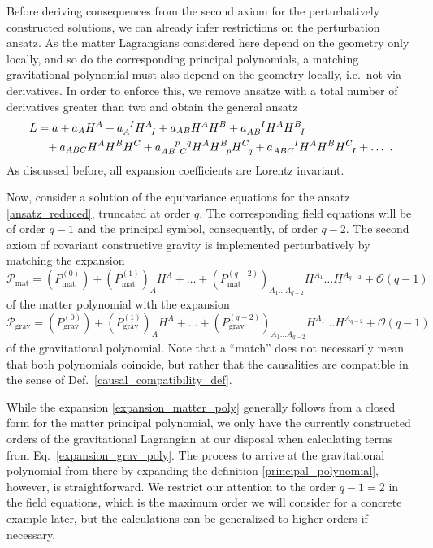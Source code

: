 Before deriving consequences from the second axiom for the perturbatively constructed solutions, we can already infer restrictions on the perturbation ansatz. As the matter Lagrangians considered here depend on the geometry only locally, and so do the corresponding principal polynomials, a matching gravitational polynomial must also depend on the geometry locally, i.e.~not via derivatives. In order to enforce this, we remove ansätze with a total number of derivatives greater than two and obtain the general ansatz
\begin{equation}\label{ansatz_reduced}
  \begin{aligned}
    L &{} = a + a_A H^A + a_A^{\hphantom AI} H^A_{\hphantom AI} + a_{AB} H^A H^B + a_{AB}^{\hphantom{AB}I} H^A H^B_{\hphantom BI} \\
      &{} \hphantom{=} + a_{ABC} H^A H^B H^C + a_{AB\hphantom pC}^{\hphantom{AB}p\hphantom Cq} H^A H^B_{\hphantom Bp} H^C_{\hphantom Cq} + a_{ABC}^{\hphantom{ABC}I} H^A H^B H^C_{\hphantom CI} + \dots \ .
  \end{aligned}
\end{equation}
As discussed before, all expansion coefficients are Lorentz invariant.

Now, consider a solution of the equivariance equations for the ansatz \eqref{ansatz_reduced}, truncated at order $q$. The corresponding field equations will be of order $q-1$ and the principal symbol, consequently, of order $q-2$. The second axiom of covariant constructive gravity is implemented perturbatively by matching the expansion
\begin{equation}\label{expansion_matter_poly}
  \mathcal P_\text{mat} = (P^{(0)}_\text{mat}) + (P^{(1)}_\text{mat})_A H^A + \dots + (P^{(q-2)}_\text{mat})_{A_1\dots A_{q-2}} H^{A_1} \dots H^{A_{q-2}} + \mathcal O(q-1)
\end{equation}
of the matter polynomial with the expansion
\begin{equation}\label{expansion_grav_poly}
  \mathcal P_\text{grav} = (P^{(0)}_\text{grav}) + (P^{(1)}_\text{grav})_A H^A + \dots + (P^{(q-2)}_\text{grav})_{A_1\dots A_{q-2}} H^{A_1} \dots H^{A_{q-2}} + \mathcal O(q-1)
\end{equation}
of the gravitational polynomial. Note that a ``match'' does not necessarily mean that both polynomials coincide, but rather that the causalities are compatible in the sense of Def.~\ref{causal_compatibility_def}.

While the expansion \eqref{expansion_matter_poly} generally follows from a closed form for the matter principal polynomial, we only have the currently constructed orders of the gravitational Lagrangian at our disposal when calculating terms from Eq.~\ref{expansion_grav_poly}. The process to arrive at the gravitational polynomial from there by expanding the definition \eqref{principal_polynomial}, however, is straightforward. We restrict our attention to the order $q-1=2$ in the field equations, which is the maximum order we will consider for a concrete example later, but the calculations can be generalized to higher orders if necessary.

